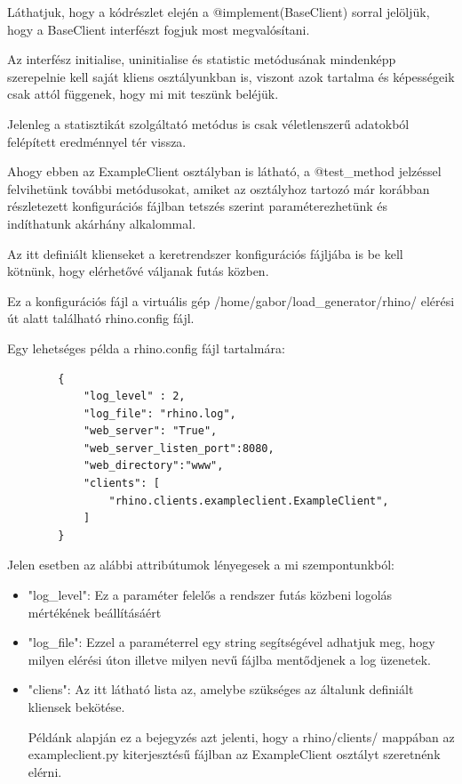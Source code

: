 \documentclass[a4paper,12pt,oneside]{report}
\begin{document}
Láthatjuk, hogy a kódrészlet elején a @implement(BaseClient) sorral jelöljük, hogy a BaseClient interfészt fogjuk most megvalósítani.

Az interfész initialise, uninitialise és statistic metódusának mindenképp szerepelnie kell saját kliens osztályunkban is, viszont azok tartalma és képességeik csak attól függenek, hogy mi mit teszünk beléjük.

Jelenleg a statisztikát szolgáltató metódus is csak véletlenszerű adatokból felépített eredménnyel tér vissza.

Ahogy ebben az ExampleClient osztályban is látható, a @test\_method jelzéssel felvihetünk további metódusokat, amiket az osztályhoz tartozó már korábban részletezett konfigurációs fájlban tetszés szerint paraméterezhetünk és indíthatunk akárhány alkalommal.

Az itt definiált klienseket a keretrendszer konfigurációs fájljába is be kell kötnünk, hogy elérhetővé váljanak futás közben.

Ez a konfigurációs fájl a virtuális gép /home/gabor/load\_generator/rhino/ elérési út alatt található rhino.config fájl.

Egy lehetséges példa a rhino.config fájl tartalmára:
\begin{lstlisting}
        {
            "log_level" : 2,
            "log_file": "rhino.log",
            "web_server": "True",
            "web_server_listen_port":8080,
            "web_directory":"www",
            "clients": [
                "rhino.clients.exampleclient.ExampleClient",
            ]
        }
\end{lstlisting}

Jelen esetben az alábbi attribútumok lényegesek a mi szempontunkból:
\begin{itemize}
\itemsep0em
    \item "log\_level": Ez a paraméter felelős a rendszer futás közbeni logolás mértékének beállításáért
    \item "log\_file": Ezzel a paraméterrel egy string segítségével adhatjuk meg, hogy milyen elérési úton illetve milyen nevű fájlba mentődjenek a log üzenetek.
    
    \item "cliens": Az itt látható lista az, amelybe szükséges az általunk definiált kliensek bekötése.
    
    Példánk alapján ez a bejegyzés azt jelenti, hogy a rhino/clients/ mappában az exampleclient.py kiterjesztésű fájlban az ExampleClient osztályt szeretnénk elérni.
\end{itemize}
\end{document}
